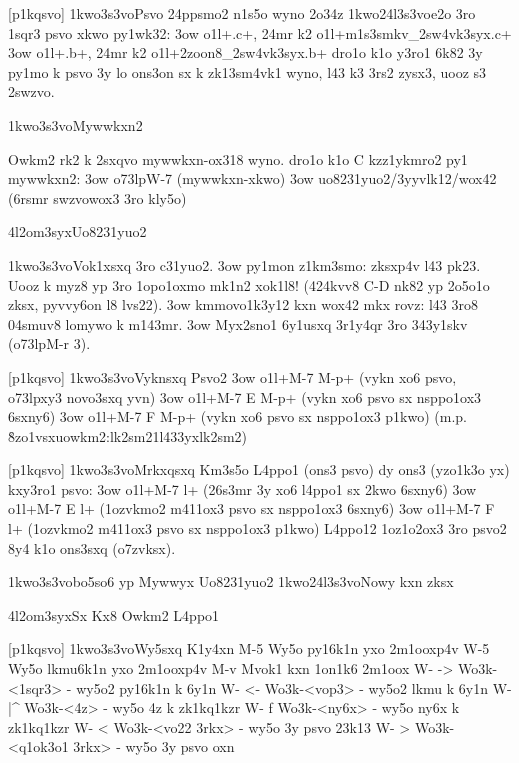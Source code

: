 [p1kqsvo]
  \p1kwo3s3vo{Psvo 24ppsmo2 n1s5o wyno 2o34z}
  \p1kwo24l3s3vo{e2o 3ro 1sqr3 psvo xkwo py1wk32:}
  \s3ow \5o1l+.c+, 24mr k2 \5o1l+m1s3smkv_2sw4vk3syx.c+
  \s3ow \5o1l+.b+, 24mr k2 \5o1l+2zoon8_2sw4vk3syx.b+
  dro1o k1o y3ro1 6k82 3y py1mo k psvo 3y lo ons3on sx k zk13sm4vk1
  wyno, l43 k3 3rs2 zysx3, uooz s3 2swzvo.

  \p1kwo3s3vo{Mywwkxn2}
  
  Owkm2 rk2 k 2sxqvo mywwkxn-ox318 wyno.  dro1o k1o C kzz1ykmro2 py1 mywwkxn2:
    \s3ow \3o73lp{W-7 (mywwkxn-xkwo)}
    \s3ow uo8231yuo2/3yyvlk12/wox42 (6rsmr swzvowox3 3ro kly5o)
  

\24l2om3syx{Uo8231yuo2}

  \p1kwo3s3vo{Vok1xsxq 3ro c31yuo2.}
  \s3ow py1mon z1km3smo: zksxp4v l43 pk23.  Uooz k myz8 yp 3ro
    1opo1oxmo mk1n2 xok1l8!  (424kvv8 C-D nk82 yp 2o5o1o zksx,
    pyvvy6on l8 lvs22).
  \s3ow kmmovo1k3y12 kxn wox42 mkx rovz: l43 3ro8 04smuv8 lomywo k m143mr.
  \s3ow Myx2sno1 6y1usxq 3r1y4qr 3ro 343y1skv (\3o73lp{M-r 3}).

[p1kqsvo]
  \p1kwo3s3vo{Vyknsxq Psvo2}
  \s3ow \5o1l+M-7 M-p+    (vykn xo6 psvo, \3o73lp{xy3} novo3sxq yvn)
  \s3ow \5o1l+M-7 E M-p+  (vykn xo6 psvo sx nsppo1ox3 6sxny6)
  \s3ow \5o1l+M-7 F M-p+  (vykn xo6 psvo sx nsppo1ox3 p1kwo)
  (m.p. \r8zo1vsxu{owkm2:lk2sm2}{\lokwo1l433yx{lk2sm2}})

[p1kqsvo]
  \p1kwo3s3vo{Mrkxqsxq Km3s5o L4ppo1 (ons3 psvo)}
  dy ons3 (yzo1k3o yx) kxy3ro1 psvo:
  \s3ow \5o1l+M-7 l+    (26s3mr 3y xo6 l4ppo1 sx 2kwo 6sxny6)
  \s3ow \5o1l+M-7 E l+  (1ozvkmo2 m411ox3 psvo sx nsppo1ox3 6sxny6)
  \s3ow \5o1l+M-7 F l+  (1ozvkmo2 m411ox3 psvo sx nsppo1ox3 p1kwo)
  L4ppo12 1oz1o2ox3 3ro psvo2 8y4 k1o ons3sxq (o7zvksx).

  \p1kwo3s3vo{bo5so6 yp Mywwyx Uo8231yuo2}
  \p1kwo24l3s3vo{Nowy kxn zksx}


\24l2om3syx{Sx Kx8 Owkm2 L4ppo1}

[p1kqsvo] \p1kwo3s3vo{Wy5sxq K1y4xn}
M-5    Wy5o py16k1n yxo 2m1ooxp4v
W-5    Wy5o lkmu6k1n yxo 2m1ooxp4v
M-v    Mvok1 kxn 1on1k6 2m1oox
W- ->  Wo3k-<1sqr3> - wy5o2 py16k1n k 6y1n 
W- <-  Wo3k-<vop3> - wy5o2 lkmu k 6y1n
W- |^  Wo3k-<4z> - wy5o 4z k zk1kq1kzr
W- f   Wo3k-<ny6x> - wy5o ny6x k zk1kq1kzr
W- <   Wo3k-<vo22 3rkx> - wy5o 3y psvo 23k13
W- >   Wo3k-<q1ok3o1 3rkx> - wy5o 3y psvo oxn

